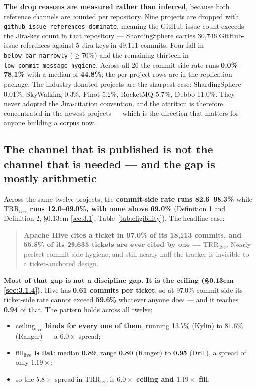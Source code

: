 \documentclass[11pt,a4paper]{article}
\begin{document}
\textbf{The drop reasons are measured rather than inferred}, because both reference channels are counted per repository. Nine projects are dropped with \texttt{github\_\allowbreak{}issue\_\allowbreak{}references\_\allowbreak{}dominate}, meaning the GitHub-issue count exceeds the Jira-key count in that repository --- ShardingSphere carries 30,746 GitHub-issue references against 5 Jira keys in 49,111 commits. Four fall in \texttt{below\_\allowbreak{}bar\_\allowbreak{}narrowly} ($\geq$70\%) and the remaining thirteen in \texttt{low\_\allowbreak{}commit\_\allowbreak{}message\_\allowbreak{}hygiene}. Across all 26 the commit-side rate runs \textbf{0.0\%--78.1\%} with a median of \textbf{44.8\%}; the per-project rows are in the replication package. The industry-donated projects are the sharpest case: ShardingSphere 0.01\%, SkyWalking 0.3\%, Pinot 5.2\%, RocketMQ 5.7\%, Dubbo 11.0\%. They never adopted the Jira-citation convention, and the attrition is therefore concentrated in the newest projects --- which is the direction that matters for anyone building a corpus now.

\subsection{The channel that is published is not the channel that is needed --- and the gap is mostly arithmetic}
\label{sec:4.2}

Across the same twelve projects, the \textbf{commit-side rate runs 82.6--98.3\%} while \textbf{$\mathrm{TRR}_\mathrm{live}$ runs 12.0--69.0\%, with none above 69.0\%} (Definition 1 and Definition 2, \S\kern0.13em \ref{sec:3.1}; Table~\ref{tab:eligibility}). The headline case:

\begin{quote}
\textbf{Apache Hive cites a ticket in 97.0\% of its 18,213 commits, and 55.8\% of its 29,635 tickets are ever cited by one --- $\mathrm{TRR}_\mathrm{live}$.} Nearly perfect commit-side hygiene, and still nearly half the tracker is invisible to a ticket-anchored design.

\end{quote}

\textbf{Most of that gap is not a discipline gap. It is the ceiling (\S\kern0.13em \ref{sec:3.1.4}).} Hive has \textbf{0.61 commits per ticket}, so at 97.0\% commit-side its ticket-side rate cannot exceed \textbf{59.6\%} whatever anyone does --- and it reaches \textbf{0.94} of that. The pattern holds across all twelve:

\begin{itemize}
\item \textbf{$\mathrm{ceiling}_\mathrm{live}$ binds for every one of them}, running 13.7\% (Kylin) to 81.6\% (Ranger) --- a $6.0\times$ spread;
\item \textbf{$\mathrm{fill}_\mathrm{live}$ is flat}: median \textbf{0.89}, range \textbf{0.80} (Ranger) to \textbf{0.95} (Drill), a spread of only \textbf{$1.19\times$};
\item so the $5.8\times$ spread in $\mathrm{TRR}_\mathrm{live}$ is \textbf{$6.0\times$ ceiling and $1.19\times$ fill}.
\end{itemize}
\end{document}
